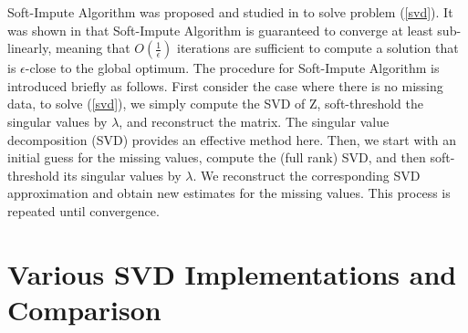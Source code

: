 \documentclass[12pt]{article}
\begin{document}
Soft-Impute Algorithm was proposed and studied in \cite{mazumder2010spectral} to solve problem (\ref{svd}). It was shown in \cite{mazumder2010spectral}  that Soft-Impute Algorithm is guaranteed to converge at least sub-linearly, meaning that $O\left(\frac{1}{\epsilon}\right)$ iterations are sufficient to 
compute a solution that is $\epsilon$-close to the global optimum.
The procedure for Soft-Impute Algorithm is introduced briefly as follows. First consider the case
where there is no missing data, to solve (\ref{svd}), we simply
compute the SVD of Z, soft-threshold the singular values by $\lambda$, and reconstruct
the matrix. The singular value decomposition (SVD) provides an effective method here. Then, we start with an initial guess for the missing values, compute
the (full rank) SVD, and then soft-threshold its singular values by $\lambda$. We reconstruct the corresponding SVD approximation and obtain new
estimates for the missing values. This process is repeated until convergence. 


\section{Various SVD Implementations and Comparison}
\end{document}
